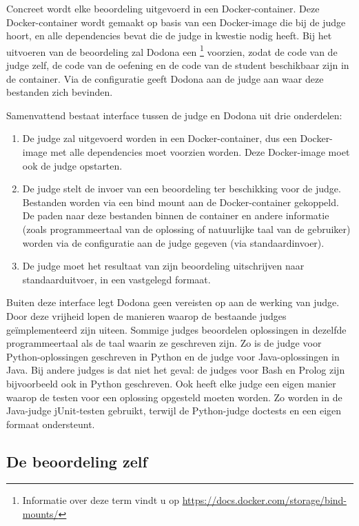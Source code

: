 Concreet wordt elke beoordeling uitgevoerd in een Docker-container.
Deze Docker-container wordt gemaakt op basis van een Docker-image die bij de judge hoort, en alle dependencies bevat die de judge in kwestie nodig heeft.
Bij het uitvoeren van de beoordeling zal Dodona een \footnote{Informatie over deze term vindt u op \url{https://docs.docker.com/storage/bind-mounts/}} voorzien, zodat de code van de judge zelf, de code van de oefening en de code van de student beschikbaar zijn in de container.
Via de configuratie geeft Dodona aan de judge aan waar deze bestanden zich bevinden.

Samenvattend bestaat interface tussen de judge en Dodona uit drie onderdelen:

\begin{enumerate}
    \item De judge zal uitgevoerd worden in een Docker-container, dus een Docker-image met alle dependencies moet voorzien worden.
    Deze Docker-image moet ook de judge opstarten.
    \item De judge stelt de invoer van een beoordeling ter beschikking voor de judge.
    Bestanden worden via een bind mount aan de Docker-container gekoppeld.
    De paden naar deze bestanden binnen de container en andere informatie (zoals programmeertaal van de oplossing of natuurlijke taal van de gebruiker) worden via de configuratie aan de judge gegeven (via standaardinvoer).
    \item De judge moet het resultaat van zijn beoordeling uitschrijven naar standaarduitvoer, in een vastgelegd formaat.
\end{enumerate}

Buiten deze interface legt Dodona geen vereisten op aan de werking van judge.
Door deze vrijheid lopen de manieren waarop de bestaande judges geïmplementeerd zijn uiteen.
Sommige judges beoordelen oplossingen in dezelfde programmeertaal als de taal waarin ze geschreven zijn.
Zo is de judge voor Python-oplossingen geschreven in Python en de judge voor Java-oplossingen in Java.
Bij andere judges is dat niet het geval: de judges voor Bash en Prolog zijn bijvoorbeeld ook in Python geschreven.
Ook heeft elke judge een eigen manier waarop de testen voor een oplossing opgesteld moeten worden.
Zo worden in de Java-judge jUnit-testen gebruikt, terwijl de Python-judge doctests en een eigen formaat ondersteunt.

\subsection{De beoordeling zelf}\label{subsec:de-beoordeling-zelf}

